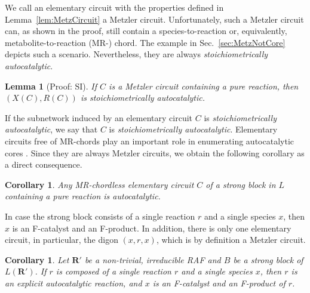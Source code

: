 \documentclass[pdflatex]{sn-jnl}
\theoremstyle{thmstyleone}%
\newtheorem{corollary}[theorem]{Corollary}%
\newtheorem{lemma}[theorem]{Lemma}%
\theoremstyle{examplesty}%
\theoremstyle{thmstylethree}%
\newcommand{\RAF}[0]{\mathbf{R}'}
\begin{document}
We call an elementary circuit with the properties defined in
Lemma~\ref{lem:MetzCircuit} a Metzler circuit. Unfortunately, such a
Metzler circuit can, as shown in the proof, still contain a species-to-reaction 
or, equivalently, metabolite-to-reaction (MR-) chord. The example in
Sec.~\ref{sec:MetzNotCore} depicts such a scenario. Nevertheless, they are
always \emph{stoichiometrically autocatalytic}.

\vspace{6pt}
\begin{lemma}[Proof: SI]\label{lem:MetzCircAut}
  If $C$ is a Metzler circuit containing a \emph{pure reaction}, then
  $(X(C), R(C))$ is \emph{stoichiometrically autocatalytic}.
\end{lemma}
\vspace{6pt} If the subnetwork induced by an elementary circuit $C$ is
\emph{stoichiometrically autocatalytic}, we say that $C$ is
\emph{stoichiometrically autocatalytic}. Elementary circuits free of
MR-chords play an important role in enumerating autocatalytic cores
\cite{golnik_using_2026}.  Since they are always Metzler circuits, we
obtain the following corollary as a direct consequence.
\vspace{6pt}
\begin{corollary}
  Any MR-chordless elementary circuit $C$ of a strong block in $L$
  containing a \emph{pure reaction} is autocatalytic.
\end{corollary}
\vspace{6pt}

In case the strong block consists of a single reaction $r$ and a single
species $x$, then $x$ is an F-catalyst and an F-product. In addition, there
is only one elementary circuit, in particular, the digon $(x,r,x)$, which
is by definition a Metzler circuit.
\vspace{6pt}
\begin{corollary}\label{cor:AutoCatReac}
  Let $\RAF$ be a non-trivial, irreducible RAF and $B$ be a strong block of
  $L(\RAF)$.  If $r$ is composed of a single reaction $r$ and a single
  species $x$, then $r$ is an explicit autocatalytic reaction, and $x$ is
  an F-catalyst and an F-product of $r$.
\end{corollary}
\vspace{6pt}
\end{document}
